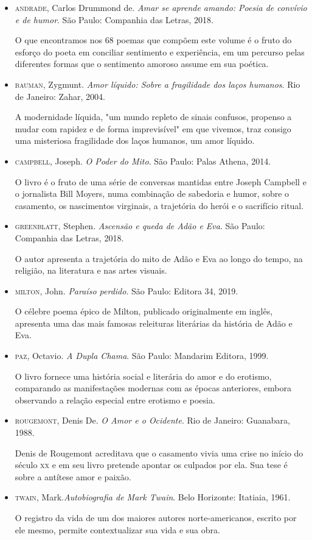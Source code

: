 \documentclass[12pt]{extarticle}
\begin{document}
\begin{itemize}

\item\textsc{andrade}, Carlos Drummond de. \textit{Amar se aprende amando: Poesia de
convívio e de humor}. São Paulo: Companhia das Letras, 2018.

O que encontramos nos 68 poemas que compõem este volume é o fruto do
esforço do poeta em conciliar sentimento e experiência, em um percurso
pelas diferentes formas que o sentimento amoroso assume em sua poética.

\item\textsc{bauman}, Zygmunt. \textit{Amor líquido: Sobre a fragilidade dos laços
humanos}. Rio de Janeiro: Zahar, 2004. 

A modernidade líquida, "um mundo repleto de sinais confusos, propenso a
mudar com rapidez e de forma imprevisível" em que vivemos, traz consigo
uma misteriosa fragilidade dos laços humanos, um amor líquido.

\item\textsc{campbell}, Joseph. \textit{O Poder do Mito}. São Paulo: Palas Athena,
2014.

O livro é o fruto de uma série de conversas mantidas entre Joseph
Campbell e o jornalista Bill Moyers, numa combinação de sabedoria e
humor, sobre o casamento, os nascimentos virginais, a trajetória do
herói e o sacrifício ritual.

\item\textsc{greenblatt}, Stephen. \textit{Ascensão e queda de Adão e Eva}. São Paulo: Companhia das Letras, 2018.

O autor apresenta a trajetória do mito de Adão e Eva ao longo do tempo,
na religião, na literatura e nas artes visuais.

\item\textsc{milton}, John. \textit{Paraíso perdido}. São Paulo: Editora 34, 2019.

O célebre poema épico de Milton, publicado originalmente em inglês,
apresenta uma das mais famosas releituras literárias da história de Adão
e Eva.

\item\textsc{paz}, Octavio. \textit{A Dupla Chama}. São Paulo: Mandarim Editora, 1999.

O livro fornece uma história social e literária do amor e do erotismo,
comparando as manifestações modernas com as épocas anteriores, embora
observando a relação especial entre erotismo e poesia.

\item\textsc{rougemont}, Denis De. \textit{O Amor e o Ocidente}. Rio de Janeiro:
Guanabara, 1988.

Denis de Rougemont acreditava que o casamento vivia uma crise no início
do século \textsc{xx} e em seu livro pretende apontar os culpados por ela. Sua
tese é sobre a antítese amor e paixão.

\item\textsc{twain}, Mark.\textit{Autobiografia de Mark Twain}. Belo Horizonte:
Itatiaia, 1961.

O registro da vida de um dos maiores autores norte-americanos, escrito
por ele mesmo, permite contextualizar sua vida e sua obra.


\end{itemize}
\end{document}
